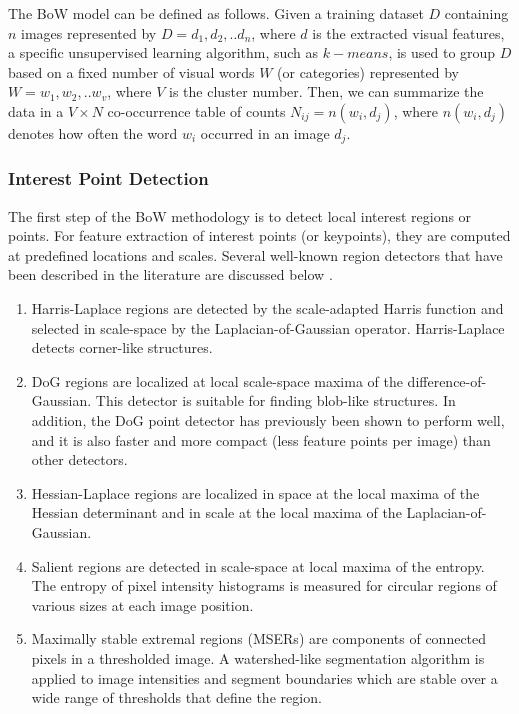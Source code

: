 The BoW model can be defined as follows. Given a training dataset $D$ containing $n$ images represented by $D = d_1, d_2,..d_n$, where $d$ is the extracted visual features, a specific unsupervised learning algorithm, such as $k-means$, is used to group $D$ based on a fixed number of visual words $W$ (or categories) represented by $W= w_1, w_2,..w_v$, where $V$ is the cluster number. Then, we can summarize the data in a $V \times N$ co-occurrence table of counts $N_{ij}=n(w_i,d_j)$, where $n(w_i,d_j)$ denotes how often the word $w_i$ occurred in an image $d_j$.

\subsubsection{Interest Point Detection}
The first step of the BoW methodology is to detect local interest regions or points. For feature extraction of interest points (or keypoints), they are computed at predefined locations and scales. Several well-known region detectors that have been described in the literature are discussed below \cite{mikolajczyk2005local, tuytelaars2008local}.

\begin{enumerate}
\item Harris-Laplace regions are detected by the scale-adapted Harris function and selected in scale-space by the Laplacian-of-Gaussian operator. Harris-Laplace detects corner-like structures.

\item DoG regions are localized at local scale-space maxima of the difference-of-Gaussian. This detector is suitable for finding blob-like structures. In addition, the DoG point detector has previously been shown to perform well, and it is also faster and more compact (less feature points per image) than other detectors.

\item Hessian-Laplace regions are localized in space at the local maxima of the Hessian determinant and in scale at the local maxima of the Laplacian-of-Gaussian.

\item Salient regions are detected in scale-space at local maxima of the entropy. The entropy of pixel intensity histograms is measured for circular regions of various sizes at each image position.

\item Maximally stable extremal regions (MSERs) are components of connected pixels in a thresholded image. A watershed-like segmentation algorithm is applied to image intensities and segment boundaries which are stable over a wide range of thresholds that define the region.
\end{enumerate}

